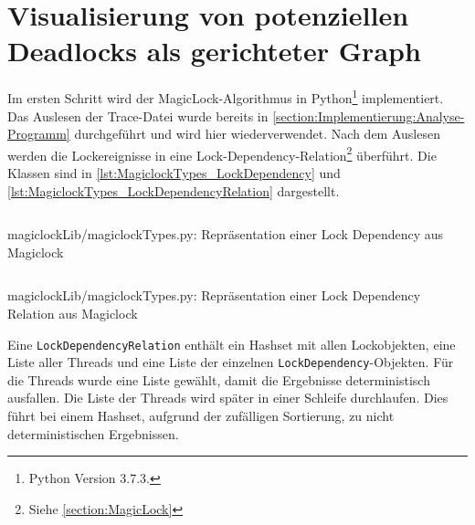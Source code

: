 \section{Visualisierung von potenziellen Deadlocks als gerichteter Graph}
\label{section:Implementierung:Visualisierung von potenziellen Deadlocks}
Im ersten Schritt wird der MagicLock-Algorithmus in Python\footnote{Python
Version 3.7.3.} implementiert. Das Auslesen der Trace-Datei wurde bereits in
\cref{section:Implementierung:Analyse-Programm} durchgeführt und wird hier
wiederverwendet. Nach dem Auslesen werden die Lockereignisse in eine
Lock-Dependency-Relation\footnote{Siehe \cref{section:MagicLock}} überführt. Die
Klassen sind in \cref{lst:MagiclockTypes_LockDependency} und
\cref{lst:MagiclockTypes_LockDependencyRelation} dargestellt.
\begin{listing}[ht]
  \inputminted[frame=lines,linenos,firstline=45,lastline=49]{python}{./Python/magiclockLib/magiclockTypes.py}
  \caption{magiclockLib/magiclockTypes.py: Repräsentation einer \textrm{Lock Dependency} aus Magiclock \autocite[3]{MagicLock}}
  \label{lst:MagiclockTypes_LockDependency}
\end{listing}
\begin{listing}[ht]
  \inputminted[frame=lines,linenos,firstline=67,lastline=77]{python}{./Python/magiclockLib/magiclockTypes.py}
  \caption{magiclockLib/magiclockTypes.py: Repräsentation einer \textrm{Lock Dependency Relation} aus Magiclock \autocite[3]{MagicLock}}
  \label{lst:MagiclockTypes_LockDependencyRelation}
\end{listing}
Eine \texttt{Lock\-Dependency\-Relation} enthält ein Hashset mit allen
Lockobjekten, eine Liste aller Threads und eine Liste der einzelnen
\texttt{Lock\-Dependency}-Objekten. Für die Threads wurde eine Liste gewählt,
damit die Ergebnisse deterministisch ausfallen. Die Liste der Threads wird
später in einer Schleife durchlaufen. Dies führt bei einem Hashset, aufgrund der
zufälligen Sortierung, zu nicht deterministischen Ergebnissen.

